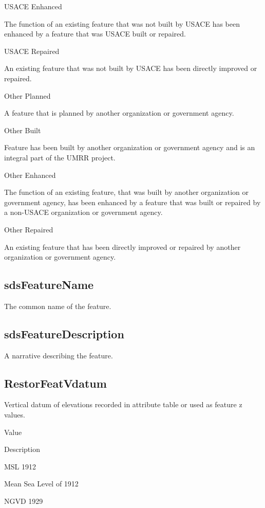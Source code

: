 \documentclass[
  letterpaper,
  DIV=11,
  numbers=noendperiod]{scrreprt}
\begin{document}
USACE Enhanced

The function of an existing feature that was not built by USACE has been
enhanced by a feature that was USACE built or repaired.

USACE Repaired

An existing feature that was not built by USACE has been directly
improved or repaired.

Other Planned

A feature that is planned by another organization or government agency.

Other Built

Feature has been built by another organization or government agency and
is an integral part of the UMRR project.

Other Enhanced

The function of an existing feature, that was built by another
organization or government agency, has been enhanced by a feature that
was built or repaired by a non-USACE organization or government agency.

Other Repaired

An existing feature that has been directly improved or repaired by
another organization or government agency.

\subsection{sdsFeatureName}\label{sdsfeaturename-26}

The common name of the feature.

\subsection{sdsFeatureDescription}\label{sdsfeaturedescription-26}

A narrative describing the feature.

\subsection{RestorFeatVdatum}\label{restorfeatvdatum-26}

Vertical datum of elevations recorded in attribute table or used as
feature z values.

Value

Description

MSL 1912

Mean Sea Level of 1912

NGVD 1929
\end{document}
